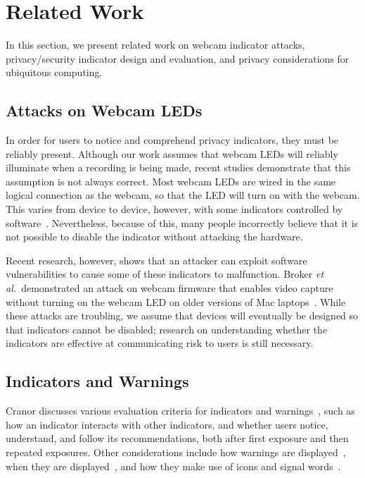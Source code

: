 \documentclass{sigchi}
\def\etal{{\it et al.~}}
\begin{document}

\section{Related Work}

In this section, we present related work on webcam indicator attacks, privacy/security indicator design and evaluation, and privacy considerations for ubiquitous computing.

\subsection{Attacks on Webcam LEDs}
In order for users to notice and comprehend privacy indicators, they must be reliably present. Although our work assumes that webcam LEDs will reliably illuminate when a recording is being made, recent studies demonstrate that this assumption is not always correct. Most webcam LEDs are wired in the same logical connection as the webcam, so that the LED will turn on with the webcam. This varies from device to device, however, with some indicators controlled by software~\cite{LogitechAnswer}. Nevertheless, because of this, many people incorrectly believe that it is not possible to disable the indicator without attacking the hardware. 

Recent research, however, shows that an attacker can exploit software vulnerabilities to cause some of these indicators to malfunction. Broker \etal demonstrated an attack on webcam firmware that enables video capture without turning on the webcam LED on older versions of Mac laptops~\cite{iSight}. While these attacks are troubling, we assume that devices will eventually be designed so that indicators cannot be disabled; research on understanding whether the indicators are effective at communicating risk to users is still necessary.

\subsection{Indicators and Warnings}
Cranor discusses various evaluation criteria for indicators and warnings~\cite{cranor2006they}, such as how an indicator interacts with other indicators, and whether users notice, understand, and follow its recommendations, both after first exposure and then repeated exposures. Other considerations include how warnings are displayed~\cite{egelman2008you}, when they are displayed~\cite{egelman2009timing}, and how they make use of icons and signal words~\cite{amer2007signal}. 
\end{document}
